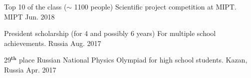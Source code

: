 \begin{cvhonors}
  \cvhonor
    {Top 10 of the class ($\sim$ 1100 people)} %
    {Scientific project competition at MIPT.} %
    {MIPT} %
    {Jun. 2018} %
    
  \cvhonor
    {President scholarship (for 4 and possibly 6 years)} %
    {For multiple school achievements.} %
    {Russia} %
    {Aug. 2017} %

  \cvhonor
    {29$^{\textbf{th}}$ place} %
    {Russian National Physics Olympiad for high school students.} %
    {Kazan, Russia} %
    {Apr. 2017} %
	
\end{cvhonors}
